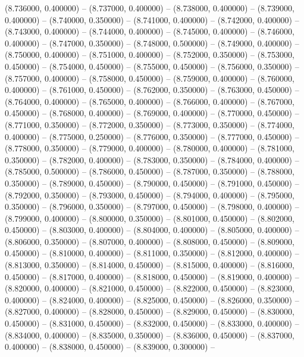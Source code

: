 (8.736000, 0.400000) -- 
(8.737000, 0.400000) -- 
(8.738000, 0.400000) -- 
(8.739000, 0.400000) -- 
(8.740000, 0.350000) -- 
(8.741000, 0.400000) -- 
(8.742000, 0.400000) -- 
(8.743000, 0.400000) -- 
(8.744000, 0.400000) -- 
(8.745000, 0.400000) -- 
(8.746000, 0.400000) -- 
(8.747000, 0.350000) -- 
(8.748000, 0.500000) -- 
(8.749000, 0.400000) -- 
(8.750000, 0.400000) -- 
(8.751000, 0.400000) -- 
(8.752000, 0.350000) -- 
(8.753000, 0.450000) -- 
(8.754000, 0.450000) -- 
(8.755000, 0.450000) -- 
(8.756000, 0.350000) -- 
(8.757000, 0.400000) -- 
(8.758000, 0.450000) -- 
(8.759000, 0.400000) -- 
(8.760000, 0.400000) -- 
(8.761000, 0.450000) -- 
(8.762000, 0.350000) -- 
(8.763000, 0.450000) -- 
(8.764000, 0.400000) -- 
(8.765000, 0.400000) -- 
(8.766000, 0.400000) -- 
(8.767000, 0.450000) -- 
(8.768000, 0.400000) -- 
(8.769000, 0.400000) -- 
(8.770000, 0.450000) -- 
(8.771000, 0.350000) -- 
(8.772000, 0.350000) -- 
(8.773000, 0.350000) -- 
(8.774000, 0.400000) -- 
(8.775000, 0.250000) -- 
(8.776000, 0.350000) -- 
(8.777000, 0.450000) -- 
(8.778000, 0.350000) -- 
(8.779000, 0.400000) -- 
(8.780000, 0.400000) -- 
(8.781000, 0.350000) -- 
(8.782000, 0.400000) -- 
(8.783000, 0.350000) -- 
(8.784000, 0.400000) -- 
(8.785000, 0.500000) -- 
(8.786000, 0.450000) -- 
(8.787000, 0.350000) -- 
(8.788000, 0.350000) -- 
(8.789000, 0.450000) -- 
(8.790000, 0.450000) -- 
(8.791000, 0.450000) -- 
(8.792000, 0.350000) -- 
(8.793000, 0.450000) -- 
(8.794000, 0.400000) -- 
(8.795000, 0.350000) -- 
(8.796000, 0.350000) -- 
(8.797000, 0.450000) -- 
(8.798000, 0.400000) -- 
(8.799000, 0.400000) -- 
(8.800000, 0.350000) -- 
(8.801000, 0.450000) -- 
(8.802000, 0.450000) -- 
(8.803000, 0.400000) -- 
(8.804000, 0.400000) -- 
(8.805000, 0.400000) -- 
(8.806000, 0.350000) -- 
(8.807000, 0.400000) -- 
(8.808000, 0.450000) -- 
(8.809000, 0.450000) -- 
(8.810000, 0.400000) -- 
(8.811000, 0.350000) -- 
(8.812000, 0.400000) -- 
(8.813000, 0.350000) -- 
(8.814000, 0.450000) -- 
(8.815000, 0.400000) -- 
(8.816000, 0.450000) -- 
(8.817000, 0.400000) -- 
(8.818000, 0.450000) -- 
(8.819000, 0.400000) -- 
(8.820000, 0.400000) -- 
(8.821000, 0.450000) -- 
(8.822000, 0.450000) -- 
(8.823000, 0.400000) -- 
(8.824000, 0.400000) -- 
(8.825000, 0.450000) -- 
(8.826000, 0.350000) -- 
(8.827000, 0.400000) -- 
(8.828000, 0.450000) -- 
(8.829000, 0.450000) -- 
(8.830000, 0.450000) -- 
(8.831000, 0.450000) -- 
(8.832000, 0.450000) -- 
(8.833000, 0.400000) -- 
(8.834000, 0.400000) -- 
(8.835000, 0.350000) -- 
(8.836000, 0.450000) -- 
(8.837000, 0.400000) -- 
(8.838000, 0.450000) -- 
(8.839000, 0.300000) -- 
